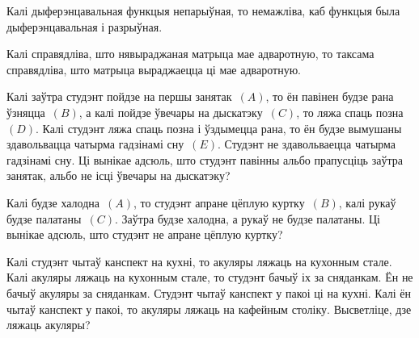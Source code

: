 \begin{problemList}
\begin{belarusianEnumerate}
			\item Калі дыферэнцавальная функцыя непарыўная, то немажліва, каб функцыя была дыферэнцавальная і разрыўная. \\
			
			\item Калі справядліва, што нявыраджаная матрыца мае адваротную, то таксама справядліва, што матрыца выраджаецца ці мае адваротную. \\
		\end{belarusianEnumerate}
		
		\bigskip
		
		\item Калі заўтра студэнт пойдзе на першы занятак~$(A)$, то ён павінен будзе рана ўзняцца~$(B)$, а калі пойдзе ўвечары на дыскатэку~$(C)$, то ляжа спаць позна~$(D)$. Калі студэнт ляжа спаць позна і ўздымецца рана, то ён будзе вымушаны здавольвацца чатырма гадзінамі сну~$(E)$. Студэнт не здавольваецца чатырма гадзінамі сну. Ці вынікае адсюль, што студэнт павінны альбо прапусціць заўтра занятак, альбо не ісці ўвечары на дыскатэку? \\
		
		\bigskip
		
		\item Калі будзе халодна~$(A)$, то студэнт апране цёплую куртку~$(B)$, калі рукаў будзе палатаны~$(C)$. Заўтра будзе халодна, а рукаў не будзе палатаны. Ці вынікае адсюль, што студэнт не апране цёплую куртку? \\
		
		\newpage
		
		\item Калі студэнт чытаў канспект на кухні, то акуляры ляжаць на кухонным стале. Калі акуляры ляжаць на кухонным стале, то студэнт бачыў іх за сняданкам. Ён не бачыў акуляры за сняданкам. Студэнт чытаў канспект у пакоі ці на кухні. Калі ён чытаў канспект у пакоі, то акуляры ляжаць на кафейным століку. Высветліце, дзе ляжаць акуляры? \\ 
		

\end{problemList}
